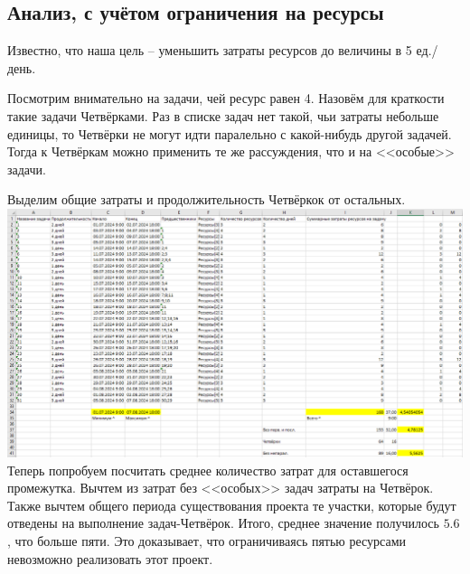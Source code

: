 \documentclass[14pt]{article}
\begin{document}
	\subsection{Анализ, с учётом ограничения на ресурсы}
		Известно, что наша цель -- уменьшить затраты ресурсов до величины в 5 ед./день.
		
		Посмотрим внимательно на задачи, чей ресурс равен 4.
		Назовём для краткости такие задачи Четвёрками.
		Раз в списке задач нет такой, чьи затраты небольше единицы, то Четвёрки не могут идти паралельно с какой-нибудь другой задачей.
		Тогда к Четвёркам можно применить те же рассуждения, что и на <<особые>> задачи.
		
		Выделим общие затраты и продолжительность Четвёркок от остальных.\\
		\includegraphics[width=\textwidth]{../img/1a3_time_estimation.png}\\ 
		
		Теперь попробуем посчитать среднее количество затрат для оставшегося промежутка.
		Вычтем из затрат без <<особых>> задач затраты на Четвёрок.
		Также вычтем общего периода существования проекта те участки, которые будут отведены на выполнение задач-Четвёрок.
		Итого, среднее значение получилось $5.6$, что больше пяти.
		Это доказывает, что ограничиваясь пятью ресурсами невозможно реализовать этот проект.
\end{document}
